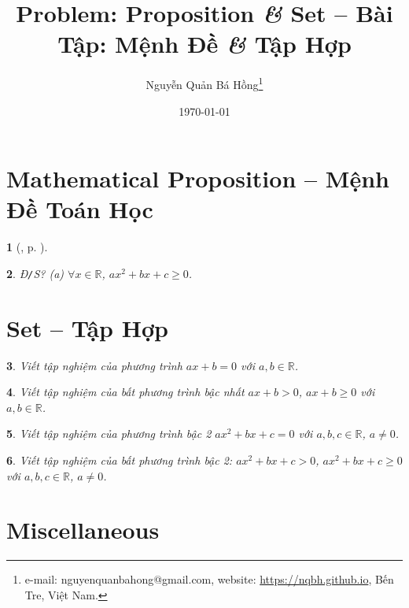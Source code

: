 \documentclass{article}
\title{Problem: Proposition {\it\&} Set -- Bài Tập: Mệnh Đề {\it\&} Tập Hợp}
\author{Nguyễn Quản Bá Hồng\footnote{e-mail: {\sf nguyenquanbahong@gmail.com}, website: \url{https://nqbh.github.io}, Bến Tre, Việt Nam.}}
\date{\today}
\newtheorem{baitoan}{}
\begin{document}
\maketitle
\tableofcontents


\section{Mathematical Proposition -- Mệnh Đề Toán Học}

\begin{baitoan}[\cite{Hai_Hung_Thu_Tung2022_tap_1}, p. ]
	
\end{baitoan}

\begin{baitoan}
	{\rm Đ{\tt/}S?} (a) $\forall x\in\mathbb{R}$, $ax^2 + bx + c\ge0$.
\end{baitoan}



\section{Set -- Tập Hợp}

\begin{baitoan}
	Viết tập nghiệm của phương trình $ax + b = 0$ với $a,b\in\mathbb{R}$.
\end{baitoan}

\begin{baitoan}
	Viết tập nghiệm của bất phương trình bậc nhất $ax + b > 0$, $ax + b\ge0$ với $a,b\in\mathbb{R}$.
\end{baitoan}

\begin{baitoan}
	Viết tập nghiệm của phương trình bậc 2 $ax^2 + bx + c = 0$ với $a,b,c\in\mathbb{R}$, $a\ne0$.
\end{baitoan}

\begin{baitoan}
	Viết tập nghiệm của bất phương trình bậc 2: $ax^2 + bx + c > 0$, $ax^2 + bx + c\ge0$ với $a,b,c\in\mathbb{R}$, $a\ne0$.
\end{baitoan}


\section{Miscellaneous}


\printbibliography[heading=bibintoc]
	
\end{document}
